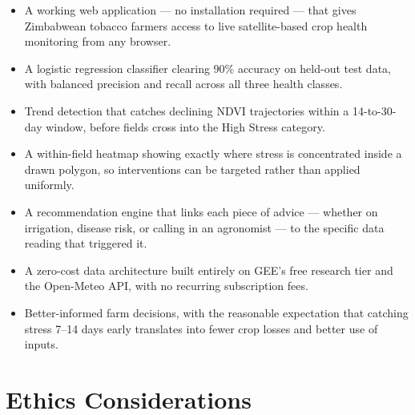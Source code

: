 \documentclass[12pt,a4paper]{report}
\begin{document}
\begin{itemize}
  \item A working web application — no installation required — that gives Zimbabwean tobacco farmers access to live satellite-based crop health monitoring from any browser.

  \item A logistic regression classifier clearing 90\% accuracy on held-out test data, with balanced precision and recall across all three health classes.

  \item Trend detection that catches declining NDVI trajectories within a 14-to-30-day window, before fields cross into the High Stress category.

  \item A within-field heatmap showing exactly where stress is concentrated inside a drawn polygon, so interventions can be targeted rather than applied uniformly.

  \item A recommendation engine that links each piece of advice — whether on irrigation, disease risk, or calling in an agronomist — to the specific data reading that triggered it.

  \item A zero-cost data architecture built entirely on GEE's free research tier and the Open-Meteo API, with no recurring subscription fees.

  \item Better-informed farm decisions, with the reasonable expectation that catching stress 7--14 days early translates into fewer crop losses and better use of inputs.
\end{itemize}

\section{Ethics Considerations}
\end{document}

